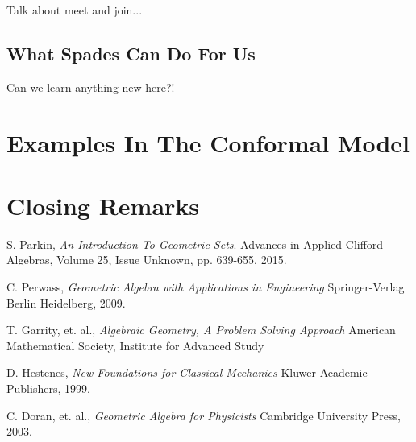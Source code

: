 \documentclass{birkjour}
\theoremstyle{definition}
\theoremstyle{remark}
\numberwithin{equation}{section}
\begin{document}
Talk about meet and join...

\subsection{What Spades Can Do For Us}

Can we learn anything new here?!

\section{Examples In The Conformal Model}

\section{Closing Remarks}

\begin{thebibliography}{9}

S. Parkin,
\emph{An Introduction To Geometric Sets}.
Advances in Applied Clifford Algebras, Volume 25, Issue Unknown, pp. 639-655, 2015.

C. Perwass,
\emph{Geometric Algebra with Applications in Engineering}
Springer-Verlag Berlin Heidelberg, 2009.

T. Garrity, et. al.,
\emph{Algebraic Geometry, A Problem Solving Approach}
American Mathematical Society, Institute for Advanced Study

D. Hestenes,
\emph{New Foundations for Classical Mechanics}
Kluwer Academic Publishers, 1999.

C. Doran, et. al.,
\emph{Geometric Algebra for Physicists}
Cambridge University Press, 2003.

\end{thebibliography}
\end{document}
